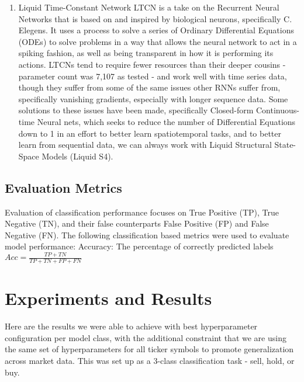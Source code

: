 \documentclass[10pt,twocolumn,letterpaper]{article}
\begin{document}
\begin{enumerate}
        \item{Liquid Time-Constant Network LTCN is a take on the Recurrent Neural Networks that is based on and inspired by biological neurons, specifically C. Elegens. It uses a process to solve a series of Ordinary Differential Equations (ODEs) to solve problems in a way that allows the neural network to act in a spiking fashion, as well as being transparent in how it is performing its actions. LTCNs tend to require fewer resources than their deeper cousins - parameter count was 7,107 as tested - and work well with time series data, though they suffer from some of the same issues other RNNs suffer from, specifically vanishing gradients, especially with longer sequence data. Some solutions to these issues have been made, specifically Closed-form Continuous-time Neural nets, which seeks to reduce the number of Differential Equations down to 1 in an effort to better learn spatiotemporal tasks, and to better learn from sequential data, we can always work with Liquid Structural State-Space Models (Liquid S4).  }
    \end{enumerate}

\subsection{Evaluation Metrics}
Evaluation of classification performance focuses on True Positive (TP), True Negative (TN), and their false counterparts False Positive (FP) and False Negative (FN). The following classification based metrics were used to evaluate model performance:
Accuracy: The percentage of correctly predicted labels
$Acc = \frac{TP + TN}{TP + TN + FP + FN}$


\section{Experiments and Results}

Here are the results we were able to achieve with best hyperparameter configuration per model class, with the additional constraint that we are using the same set of hyperparameters for all ticker symbols to promote generalization across market data. This was set up as a 3-class classification task - sell, hold, or buy.
\end{document}
